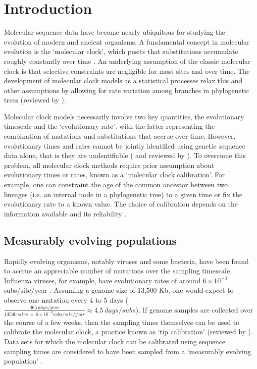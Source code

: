 \documentclass[11pt]{article}
\begin{document}
\section{Introduction}
Molecular sequence data have become nearly ubiquitous for studying the evolution of modern and ancient organisms. A fundamental concept in molecular evolution is the `molecular clock', which posits that substitutions accumulate roughly constantly over time \citep{zuckerkandl1965evolutionary}. An underlying assumption of the classic molecular clock is that selective constraints are negligible for most sites and over time. The development of molecular clock models as a statistical processes relax this and other assumptions by allowing for rate variation among branches in phylogenetic trees (reviewed by \cite{ho2014molecular}).

Molecular clock models necessarily involve two key quantities, the evolutionary timescale and the `evolutionary rate', with the latter representing the combination of mutations and substitutions that accrue over time. However, evolutionary times and rates cannot be jointly identified using genetic sequence data alone, that is they are undentifiable (\cite{dos2013unbearable} and reviewed by \cite{bromham2018bayesian}). To overcome this problem, all molecular clock methods require prior assumption about evolutionary times or rates, known as a `molecular clock calibration'. For example, one can constraint the age of the common ancestor between two lineages (i.e. an internal node in a phylogenetic tree) to a given time or fix the evolutionary rate to a known value. The choice of calibration depends on the information available and its reliability \citep{warnock2012exploring, duchene2014impact}. 

\subsection{Measurably evolving populations}
Rapidly evolving organisms, notably viruses and some bacteria, have been found to accrue an appreciable number of mutations over the sampling timescale. Influenza viruses, for example, have evolutionary rates of around $6\times10^{-3}$ subs/site/year \citep{ghafari2021purifying, sanjuan2012molecular}. Assuming a genome size of 13,500 Kb, one would expect to observe one mutation every 4 to 5 days ($\frac{365\ days/year}{13500\ sites\ \times\ 6\times10^{-3}subs/site/year}\approx4.5\ days/subs$). If genome samples are collected over the course of a few weeks, then the sampling times themselves can be used to calibrate the molecular clock, a practice known as `tip calibration' (reviewed by \cite{rieux2016inferences}). Data sets for which the molecular clock can be calibrated using sequence sampling times are considered to have been sampled from a `measurably evolving population' \citep{drummond2003measurably}.
\end{document}
